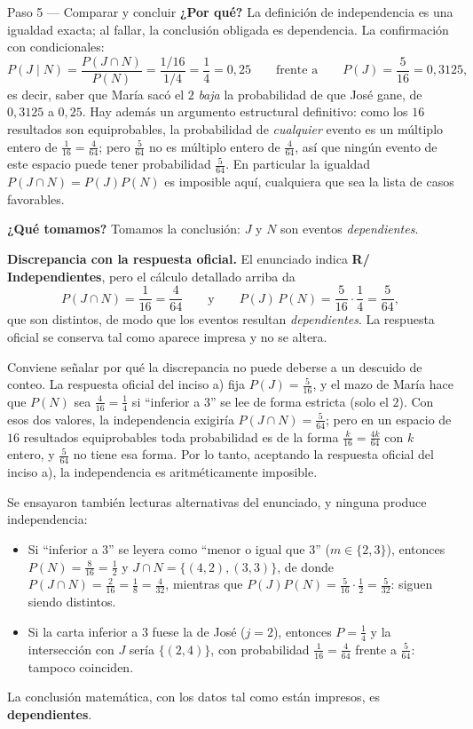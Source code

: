 \documentclass[11pt]{article}
\begin{document}
\begin{sol}
\begin{paso}{Paso 5 --- Comparar y concluir}
\textbf{¿Por qué?} La definición de independencia es una igualdad exacta; al fallar, la
conclusión obligada es dependencia. La confirmación con condicionales:
\[
P(J\mid N)=\frac{P(J\cap N)}{P(N)}=\frac{1/16}{1/4}=\frac{1}{4}=0{,}25
\qquad\text{frente a}\qquad
P(J)=\frac{5}{16}=0{,}3125,
\]
es decir, saber que María sacó el $2$ \emph{baja} la probabilidad de que José gane, de
$0{,}3125$ a $0{,}25$. Hay además un argumento estructural definitivo: como los $16$
resultados son equiprobables, la probabilidad de \emph{cualquier} evento es un múltiplo entero
de $\frac{1}{16}=\frac{4}{64}$; pero $\frac{5}{64}$ no es múltiplo entero de $\frac{4}{64}$,
así que ningún evento de este espacio puede tener probabilidad $\frac{5}{64}$. En particular
la igualdad $P(J\cap N)=P(J)P(N)$ es imposible aquí, cualquiera que sea la lista de casos
favorables.

\textbf{¿Qué tomamos?} Tomamos la conclusión: $J$ y $N$ son eventos \emph{dependientes}.
\end{paso}
\end{sol}

\begin{nota}
\textbf{Discrepancia con la respuesta oficial.} El enunciado indica \textbf{R/
Independientes}, pero el cálculo detallado arriba da
\[
P(J\cap N)=\frac{1}{16}=\frac{4}{64}
\qquad\text{y}\qquad
P(J)\,P(N)=\frac{5}{16}\cdot\frac14=\frac{5}{64},
\]
que son distintos, de modo que los eventos resultan \emph{dependientes}. La respuesta oficial
se conserva tal como aparece impresa y no se altera.

Conviene señalar por qué la discrepancia no puede deberse a un descuido de conteo. La
respuesta oficial del inciso a) fija $P(J)=\frac{5}{16}$, y el mazo de María hace que
$P(N)$ sea $\frac{4}{16}=\frac14$ si ``inferior a 3'' se lee de forma estricta (solo el $2$).
Con esos dos valores, la independencia exigiría $P(J\cap N)=\frac{5}{64}$; pero en un espacio
de $16$ resultados equiprobables toda probabilidad es de la forma $\frac{k}{16}=\frac{4k}{64}$
con $k$ entero, y $\frac{5}{64}$ no tiene esa forma. Por lo tanto, aceptando la respuesta
oficial del inciso a), la independencia es aritméticamente imposible.

Se ensayaron también lecturas alternativas del enunciado, y ninguna produce independencia:
\begin{itemize}[leftmargin=*]
  \item Si ``inferior a 3'' se leyera como ``menor o igual que 3'' ($m\in\{2,3\}$), entonces
        $P(N)=\frac{8}{16}=\frac12$ y $J\cap N=\{(4,2),(3,3)\}$, de donde
        $P(J\cap N)=\frac{2}{16}=\frac18=\frac{4}{32}$, mientras que
        $P(J)P(N)=\frac{5}{16}\cdot\frac12=\frac{5}{32}$: siguen siendo distintos.
  \item Si la carta inferior a $3$ fuese la de José ($j=2$), entonces $P=\frac14$ y la
        intersección con $J$ sería $\{(2,4)\}$, con probabilidad $\frac{1}{16}=\frac{4}{64}$
        frente a $\frac{5}{64}$: tampoco coinciden.
\end{itemize}
La conclusión matemática, con los datos tal como están impresos, es \textbf{dependientes}.
\end{nota}
\end{document}
